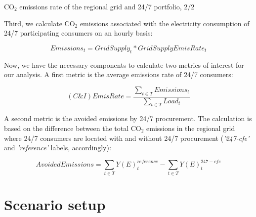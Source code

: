 \begin{frame}{CO$_2$ emissions rate of the regional grid and 24/7 portfolio, 2/2}

  {\small
  Third, we calculate {CO$_2$ emissions} associated with the electricity consumption of 
  24/7 participating consumers on an hourly basis:
  
  \begin{equation*}
  Emissions_t = GridSupply_t * GridSupplyEmisRate_t
  \end{equation*}

  Now, we have the necessary components to calculate two metrics of interest for our analysis. 
  A first metric is the \alert{average emissions rate of 24/7 consumers}:

  \begin{equation*}
    (C\&I)EmisRate = \frac{\sum_{t\in T} Emissions_t}{\sum_{t\in T} Load_t}
  \end{equation*}

  A second metric is the \alert{avoided emissions} by 24/7 procurement. The calculation is based on the 
  difference between the total {CO$_2$ emissions} in the regional grid where 24/7 consumers are located
  with and without 24/7 procurement (\emph{'247-cfe'} and \emph{'reference'} labels, accordingly):

  \begin{equation*}
    AvoidedEmissions = \sum_{t\in T} Y(E)_t^{reference} - \sum_{t\in T} Y(E)_t^{247-cfe}
  \end{equation*}
  }

\end{frame}


\section{Scenario setup}


